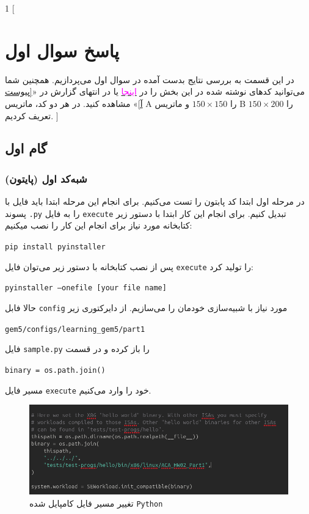 \documentclass[12pt]{exam}
\begin{document}





\begin{multicols}{1}
	[
	\section{پاسخ سوال اول}
	در این قسمت به بررسی نتایج بدست آمده در سوال اول می‌پردازیم. همچنین شما می‌توانید کد‌های نوشته شده در این بخش را در \href{google.com}{\textcolor{magenta}{اینجا}} یا در انتهای گزارش در «\textcolor{magenta}{\ref{پیوست آ}}» مشاهده کنید. در هر دو کد،‌ ماتریس A را $150\times150$ و ماتریس B را $150\times200$ تعریف کردیم.
	]
	
	\subsection{گام اول}
	\subsubsection{شبه‌کد اول (پایتون)}
	در مرحله اول ابتدا کد پابتون را تست می‌کنیم. برای انجام این مرحله ابتدا باید فایل با پسوند \texttt{.py} را به فایل \texttt{execute} تبدیل کنیم. برای انجام این کار ابتدا با دستور زیر کتابخانه مورد نیاز برای انجام این کار را نصب میکنیم:
	\begin{latin}
		\texttt{pip install pyinstaller}
	\end{latin}
	
	
	پس از نصب کتابخانه با دستور زیر می‌توان فایل \texttt{execute} را تولید کرد:
	\begin{latin}
		\texttt{pyinstaller --onefile [your file name]}
	\end{latin}
	
	حالا فابل \texttt{config} مورد نیاز با شبیه‌سازی خودمان را می‌سازیم.
	از دایرکتوری زیر
	\begin{latin}
		\texttt{gem5/configs/learning\_gem5/part1}
	\end{latin}
	 فایل \texttt{sample.py} را باز کرده و در قسمت
	 \begin{latin}
	 	\texttt{binary = os.path.join()}
	 \end{latin}
	 
	  مسیر فایل \texttt{execute} خود را وارد می‌کنیم.
	  
	  \begin{center}
	  	\begin{figure}[H]
	  		\includegraphics[scale=0.29]{images/img1.png}
	  		\caption{تغییر مسیر فایل کامپایل شده \texttt{Python}}
	  		\label{تغییر مسیر}
	  	\end{figure}
	  \end{center}
	  

\end{multicols}
\end{document}
